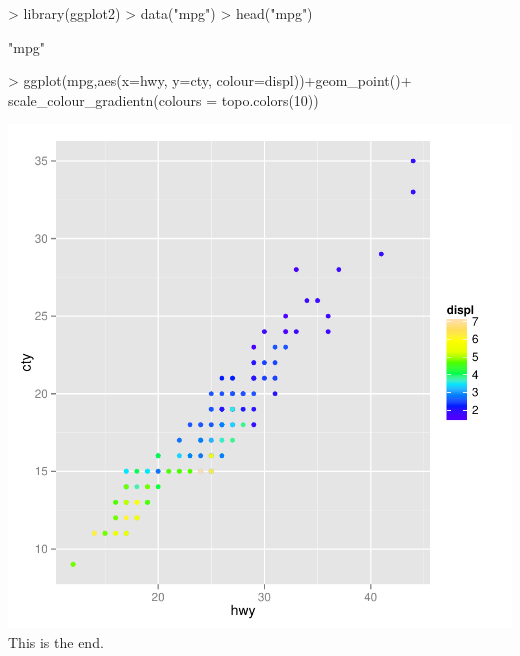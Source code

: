 \documentclass{article}
\begin{document}
\begin{Schunk}
\begin{Sinput}
> library(ggplot2)
> data("mpg")
> head("mpg")
\end{Sinput}
\begin{Soutput}
[1] "mpg"
\end{Soutput}
\begin{Sinput}
> ggplot(mpg,aes(x=hwy, y=cty, colour=displ))+geom_point()+ scale_colour_gradientn(colours = topo.colors(10))
\end{Sinput}
\end{Schunk}
\includegraphics{tutorialJY-Cars3}
This is the end.
\end{document}
